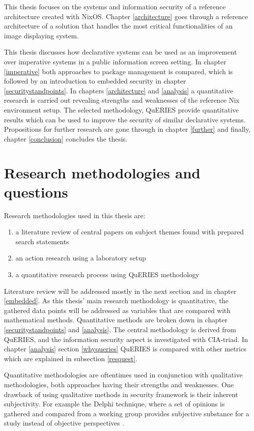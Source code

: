 This thesis focuses on the systems and information security of a
reference architecture created with NixOS. Chapter \ref{architecture}
goes through a reference architecture of a solution that handles the
most critical functionalities of an image displaying system.

This thesis discusses how declarative systems can be used as an
improvement over imperative systems in a public information screen
setting. In chapter \ref{imperative} both approaches to package
management is compared, which is followed by an introduction to
embedded security in chapter \ref{securitystandpoints}. In chapters
\ref{architecture} and \ref{analysis} a quantitative research is
carried out revealing strengths and weaknesses of the reference Nix
environment setup. The selected methodology, QuERIES provide
quantitative results which can be used to improve the security of
similar declarative systems. Propositions for further research are
gone through in chapter \ref{further} and finally, chapter
\ref{conclusion} concludes the thesis.

\section{Research methodologies and questions}

Research methodologies used in this thesis are:
\begin{enumerate}
\item a literature review of central papers on subject themes found
  with prepared search statements
\item an action research using a laboratory setup
\item a quantitative research process using QuERIES methodology
\end{enumerate}

Literature review will be addressed mostly in the next section and in
chapter \ref{embedded}. As this thesis' main research methodology is
quantitative, the gathered data points will be addressed as variables
that are compared with mathematical methods. Quantitative methods are
broken down in chapter \ref{securitystandpoints} and
\ref{analysis}. The central methodology is derived from QuERIES, and
the information security aspect is investigated with CIA-triad. In
chapter \ref{analysis} section \ref{whyqueries} QuERIES is compared
with other metrics which are explained in subsection \ref{resquest}.

Quantitative methodologies are oftentimes used in conjunction with
qualitative methodologies, both approaches having their strengths and
weaknesses. One drawback of using qualitative methods in security
framework is their inherent subjectivity. For example the Delphi
technique, where a set of opinions is gathered and compared from a
working group provides subjective substance for a study instead of
objective perspectives \cite{wang2005information}.

